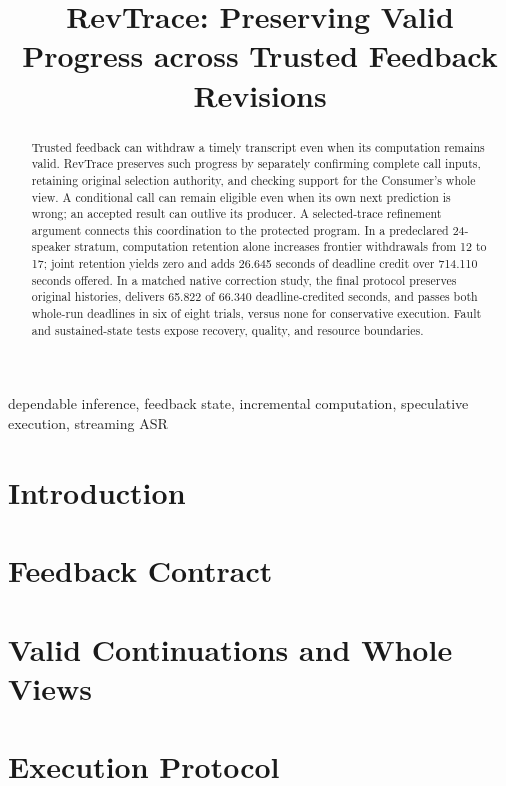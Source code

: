 \documentclass[conference,10pt]{IEEEtran}
\begin{document}
\title{RevTrace: Preserving Valid Progress across Trusted Feedback Revisions}
\author{}
\maketitle
\begin{abstract}
Trusted feedback can withdraw a timely transcript even when its
computation remains valid. RevTrace preserves such progress by separately
confirming complete call inputs, retaining original selection authority,
and checking support for the Consumer's whole view. A conditional call
can remain eligible even when its own next prediction is wrong; an
accepted result can outlive its producer. A selected-trace refinement
argument connects this coordination to the protected program. In a
predeclared 24-speaker stratum, computation retention alone increases
frontier withdrawals from 12 to 17; joint retention yields zero and adds
26.645 seconds of deadline credit over 714.110 seconds offered. In a
matched native correction study, the final protocol preserves original
histories, delivers 65.822 of 66.340 deadline-credited seconds, and passes
both whole-run deadlines in six of eight trials, versus none for
conservative execution. Fault and sustained-state tests expose recovery,
quality, and resource boundaries.
\end{abstract}
\begin{IEEEkeywords}
dependable inference, feedback state, incremental computation, speculative execution, streaming ASR
\end{IEEEkeywords}
\section{Introduction}\label{sec:intro}

\section{Feedback Contract}\label{sec:contract}

\section{Valid Continuations and Whole Views}\label{sec:continuation}




\section{Execution Protocol}\label{sec:protocol}


\end{document}
